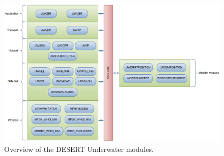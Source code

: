 \documentclass[12pt]{article}
\newcommand{\figw}{1\linewidth}
\begin{document}
\newpage

\begin{figure}[h]
\begin{center}
\includegraphics[width=\figw]{figure/DESERT_scheme.eps}
\centering 
\caption{Overview of the DESERT Underwater modules.}
\label{fig:scheme}
\end{center}
\end{figure}

\newpage











\end{document}
